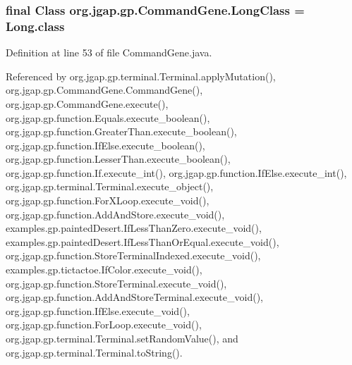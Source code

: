 \hypertarget{classorg_1_1jgap_1_1gp_1_1_command_gene_aa6af3e3a6fcf5e73f008eca7718a3b4e}{
\subsubsection[{Long\-Class}]{\setlength{\rightskip}{0pt plus 5cm}final Class org.\-jgap.\-gp.\-Command\-Gene.\-Long\-Class = Long.\-class\hspace{0.3cm}{\ttfamily [static]}}}\label{classorg_1_1jgap_1_1gp_1_1_command_gene_aa6af3e3a6fcf5e73f008eca7718a3b4e}


Definition at line 53 of file Command\-Gene.\-java.



Referenced by org.\-jgap.\-gp.\-terminal.\-Terminal.\-apply\-Mutation(), org.\-jgap.\-gp.\-Command\-Gene.\-Command\-Gene(), org.\-jgap.\-gp.\-Command\-Gene.\-execute(), org.\-jgap.\-gp.\-function.\-Equals.\-execute\-\_\-boolean(), org.\-jgap.\-gp.\-function.\-Greater\-Than.\-execute\-\_\-boolean(), org.\-jgap.\-gp.\-function.\-If\-Else.\-execute\-\_\-boolean(), org.\-jgap.\-gp.\-function.\-Lesser\-Than.\-execute\-\_\-boolean(), org.\-jgap.\-gp.\-function.\-If.\-execute\-\_\-int(), org.\-jgap.\-gp.\-function.\-If\-Else.\-execute\-\_\-int(), org.\-jgap.\-gp.\-terminal.\-Terminal.\-execute\-\_\-object(), org.\-jgap.\-gp.\-function.\-For\-X\-Loop.\-execute\-\_\-void(), org.\-jgap.\-gp.\-function.\-Add\-And\-Store.\-execute\-\_\-void(), examples.\-gp.\-painted\-Desert.\-If\-Less\-Than\-Zero.\-execute\-\_\-void(), examples.\-gp.\-painted\-Desert.\-If\-Less\-Than\-Or\-Equal.\-execute\-\_\-void(), org.\-jgap.\-gp.\-function.\-Store\-Terminal\-Indexed.\-execute\-\_\-void(), examples.\-gp.\-tictactoe.\-If\-Color.\-execute\-\_\-void(), org.\-jgap.\-gp.\-function.\-Store\-Terminal.\-execute\-\_\-void(), org.\-jgap.\-gp.\-function.\-Add\-And\-Store\-Terminal.\-execute\-\_\-void(), org.\-jgap.\-gp.\-function.\-If\-Else.\-execute\-\_\-void(), org.\-jgap.\-gp.\-function.\-For\-Loop.\-execute\-\_\-void(), org.\-jgap.\-gp.\-terminal.\-Terminal.\-set\-Random\-Value(), and org.\-jgap.\-gp.\-terminal.\-Terminal.\-to\-String().

